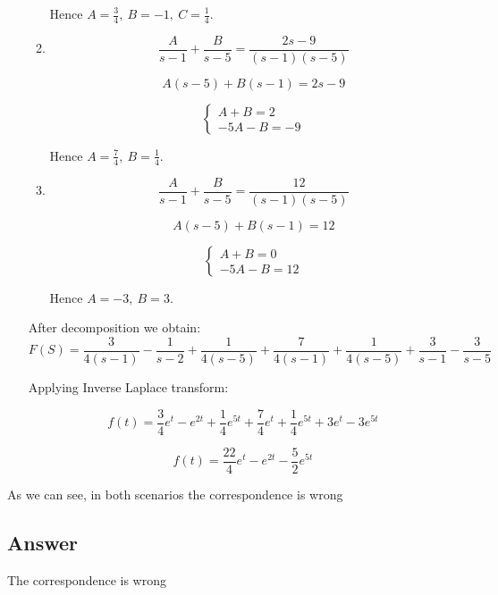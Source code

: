 \begin{enumerate}
\begin{enumerate}
                Hence $A = \frac{3}{4},\ B = -1,\ C = \frac{1}{4}$.
            \item 
                \[\frac{A}{s - 1} + \frac{B}{s - 5} = \frac{2s - 9}{(s - 1)(s - 5)}\]

                \[A(s - 5) + B(s - 1) = 2s - 9\]

                \begin{displaymath}
                    \begin{cases}
                        A + B = 2 \\
                        -5A - B = -9
                    \end{cases}
                \end{displaymath}

                Hence $A = \frac{7}{4},\ B = \frac{1}{4}$.
            \item 
                \[\frac{A}{s - 1} + \frac{B}{s - 5} = \frac{12}{(s - 1)(s - 5)}\]

                \[A(s - 5) + B(s - 1) = 12\]

                \begin{displaymath}
                    \begin{cases}
                        A + B = 0 \\
                        -5A - B = 12
                    \end{cases}
                \end{displaymath}

                Hence $A = -3,\ B = 3$.
        \end{enumerate}

        After decomposition we obtain:
        \[F(S) = \frac{3}{4(s - 1)} - \frac{1}{s - 2} + \frac{1}{4(s - 5)} + \frac{7}{4(s - 1)} + \frac{1}{4(s - 5)} + \frac{3}{s - 1} - \frac{3}{s - 5}\]

        Applying Inverse Laplace transform:

        \[f(t) = \frac{3}{4} e^t - e^{2t} + \frac{1}{4} e^{5t} + \frac{7}{4}e^t + \frac{1}{4}e^{5t} + 3e^t - 3e^{5t}\]

        \[f(t) = \frac{22}{4} e^t - e^{2t} - \frac{5}{2}e^{5t}\]

\end{enumerate}

As we can see, in both scenarios the correspondence is wrong

\subsection*{Answer}

The correspondence is wrong